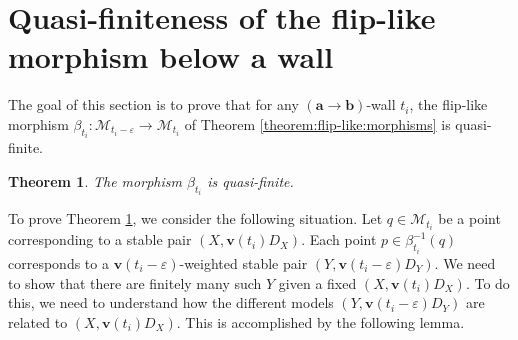 \documentclass[11pt]{amsart}
\newtheorem{theorem}{Theorem}[section]
\theoremstyle{definition}
\theoremstyle{remark}
\newcommand{\sM}{\mathscr{M}}
\newcommand{\bfa}{\mathbf{a}}
\newcommand{\bfv}{\mathbf{v}}
\newcommand{\bfb}{\mathbf{b}}
\begin{document}
	\section{Quasi-finiteness of the flip-like morphism below a wall}\label{Section:finite} 
	
	The goal of this section is to prove that for any $(\bfa \to \bfb)$-wall $t_i$, the flip-like morphism $\beta_{t_i} : \sM_{t_i - \varepsilon} \to \sM_{t_i}$ of Theorem \ref{theorem:flip-like:morphisms} is quasi-finite.  
	
	\begin{theorem}\label{thm:finite}
		The morphism $\beta_{t_i}$ is quasi-finite.
	\end{theorem}
	
	
	
	
	
	To prove Theorem \ref{thm:finite}, we consider the following situation. Let $q \in \sM_{t_i}$ be a point corresponding to a stable pair $(X, \bfv(t_i)D_X)$. Each point $p \in \beta_{t_i}^{-1}(q)$ corresponds to a $\bfv(t_{i} - \varepsilon)$-weighted stable pair $(Y, \bfv(t_i - \varepsilon)D_Y)$. We need to show that there are finitely many such $Y$ given a fixed $(X, \bfv(t_i)D_X)$. To do this, we need to understand how the different models $(Y, \bfv(t_i - \varepsilon)D_Y)$ are related to $(X,  \bfv(t_i)D_X)$. This is accomplished by the following lemma. 
	
\end{document}
